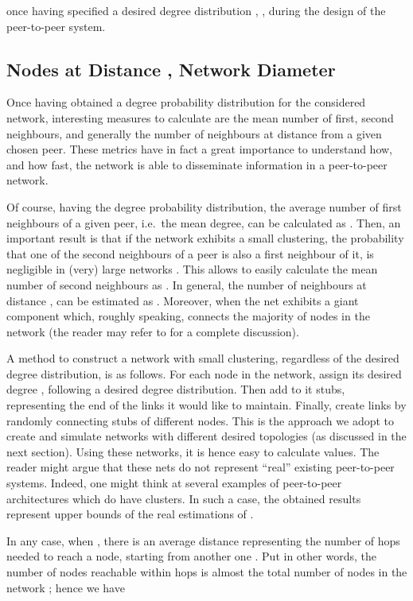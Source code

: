 \documentclass[a4paper,twosided]{article}
\begin{document}
once having specified a desired degree distribution , , during the design of the peer-to-peer system.

\subsection{Nodes at Distance , Network Diameter}
\label{sec:mean_neigh}

Once having obtained a degree probability distribution for the considered network, interesting measures to calculate are the mean number of first, second neighbours, and generally the number of neighbours at distance  from a given chosen peer. These metrics have in fact a great importance to understand how, and how fast, the network is able to disseminate information in a peer-to-peer network.

Of course, having the degree probability distribution, the average number of first neighbours  of a given peer, i.e.~the mean degree, can be calculated as . 
Then, an important result is that if the network exhibits a small clustering, the probability that one of the second neighbours of a peer is also a first neighbour of it, is negligible in (very) large networks \cite{newmanHandbook}. This allows to easily calculate the mean number of second neighbours as . In general, the number of neighbours at distance , can be estimated as . Moreover, when  the net exhibits a giant component which, roughly speaking, connects the majority of nodes in the network (the reader may refer to \cite{newmanHandbook} for a complete discussion).

A method to construct a network with small clustering, regardless of the desired degree distribution, is as follows. For each node  in the network, assign its desired degree , following a desired degree distribution. Then add to it  stubs, representing the end of the links it would like to maintain. Finally, create links by randomly connecting stubs of different nodes. This is the approach we adopt to create and simulate networks with different desired topologies (as discussed in the next section). Using these networks, it is hence easy to calculate  values. The reader might argue that these nets do not represent ``real'' existing peer-to-peer systems. Indeed, one might think at several examples of peer-to-peer architectures which do have clusters. In such a case, the obtained results represent upper bounds of the real estimations of . 

In any case, 
when , there is an average distance  representing the number of hops needed to reach a node, starting from another one \cite{newmanHandbook}. Put in other words, the number of nodes reachable within  hops is almost the total number of nodes in the network ; hence we have 
\end{document}
